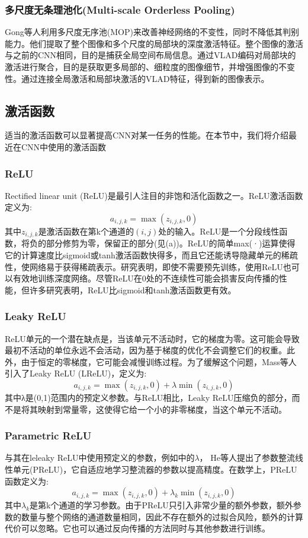 \documentclass[final]{cvpr}
\begin{document}
\subsubsection{多尺度无条理池化(Multi-scale Orderless Pooling)}
Gong等人利用多尺度无序池(MOP)来改善神经网络的不变性，同时不降低其判别能力。他们提取了整个图像和多个尺度的局部块的深度激活特征。整个图像的激活与之前的CNN相同，目的是捕获全局空间布局信息。通过VLAD编码对局部块的激活进行聚合，目的是获取更多局部的、细粒度的图像细节，并增强图像的不变性。通过连接全局激活和局部块激活的VLAD特征，得到新的图像表示。
\subsection{激活函数}
适当的激活函数可以显著提高CNN对某一任务的性能。在本节中，我们将介绍最近在CNN中使用的激活函数
\subsubsection{ReLU}
Rectified linear unit (ReLU)是最引人注目的非饱和活化函数之一。ReLU激活函数定义为:
\begin{equation}
	a_{i,j,k}=\max(z_{i,j,k},0)
\end{equation}
其中$z_{i,j,k}$是激活函数在第k个通道的$(i,j)$处的输入。ReLU是一个分段线性函数，将负的部分修剪为零，保留正的部分(见(a))。ReLU的简单max(·)运算使得它的计算速度比sigmoid或tanh激活函数快得多，而且它还能诱导隐藏单元的稀疏性，使网络易于获得稀疏表示。研究表明，即使不需要预先训练，使用ReLU也可以有效地训练深度网络。尽管ReLU在0处的不连续性可能会损害反向传播的性能，但许多研究表明，ReLU比sigmoid和tanh激活函数更有效。
\subsubsection{Leaky ReLU}
ReLU单元的一个潜在缺点是，当该单元不活动时，它的梯度为零。这可能会导致最初不活动的单位永远不会活动，因为基于梯度的优化不会调整它们的权重。此外，由于恒定的零梯度，它可能会减慢训练过程。为了缓解这个问题，Mass等人引入了Leaky ReLU (LReLU)，定义为:
\begin{equation}\label{formula10}
	a_{i,j,k}=\max(z_{i,j,k},0)+\lambda\min(z_{i,j,k},0)
\end{equation}
其中λ是(0,1)范围内的预定义参数。与ReLU相比，Leaky ReLU压缩负的部分，而不是将其映射到常量零，这使得它给一个小的非零梯度，当这个单元不活动。
\subsubsection{Parametric ReLU}
与其在leleaky ReLU中使用预定义的参数，例如中的$\lambda$， He等人提出了参数整流线性单元(PReLU)，它自适应地学习整流器的参数以提高精度。在数学上，PReLU函数定义为:
\begin{equation}
	a_{i,j,k}=\max(z_{i,j,k},0)+\lambda_k\min(z_{i,j,k},0)
\end{equation}
其中$\lambda_k$是第k个通道的学习参数。由于PReLU只引入非常少量的额外参数，额外参数的数量与整个网络的通道数量相同，因此不存在额外的过拟合风险，额外的计算代价可以忽略。它也可以通过反向传播的方法同时与其他参数进行训练。
\end{document}
